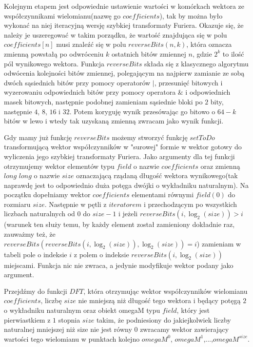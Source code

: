 \documentclass{article}
\begin{document}
Kolejnym etapem jest odpowiednie ustawienie wartości w komórkach wektora ze współczynnikami wielomianu(nazwę go $coefficients$), tak by można było wykonać na niej iteracyjną wersję szybkiej transformaty
Furiera. Okazuje się, że należy je uszeregować w takim porządku, że wartość znajdująca się w polu $coefficients[n]$ musi znaleźć
się w polu $reverseBits(n,k)$, która oznacza zmienną powstałą po odwróceniu $k$ ostatnich bitów zmiennej $n$, gdzie 
$2^k$ to ilość pól wynikowego wektora. Funkcja $reverseBits$ składa się z klasycznego algorytmu odwócenia kolejności bitów 
zmiennej, polegającym na najpierw zamianie ze sobą dwóch sąsiednich bitów przy pomocy operatorów $|$, przesunięć bitowych
i wyzerowaniu odpowiednich bitów przy pomocy operatora $\&$ i odpowiednich masek bitowych, następnie podobnej zamieniam sąsiednie bloki
po $2$ bity, następnie $4$, $8$, $16$ i $32$. Potem koryguję wynik przesówając go bitowo o $64-k$ bitów w lewo i wtedy tak uzyskaną zmienną zwracam jako wynik funkcji.

Gdy mamy już funkcję $reverseBits$ możemy stworzyć funkcję $setToDo$ transformującą wektor współczynników w "surowej" formie w wektor gotowy
do wyliczenia jego szybkiej transformaty Furiera. Jako argumenty dla tej funkcji otrzymujemy wektor elementów typu $field$ o nazwie $coefficients$ oraz
zmienną $long$ $long$ o nazwie $size$ oznaczającą rządaną długość wektora wynikowego(tak naprawdę jest to odpowiednio duża potęga dwójki o wykładniku naturalnym). Na początku dopełniamy wektor $coefficients$ elementami równymi $field(0)$ do rozmiaru $size$. Następnie w pętli z $iteratorem$ i przechodzącym po wszystkich liczbach naturalnych od $0$ do $size-1$ i jeżeli $reverseBits(i,\log_2(size)) > i$(warunek ten służy temu, by każdy element został zamieniony dokładnie raz, zauważmy też, że $reverseBits( reverseBits (i ,\log_2(size)),\log_2(size))=i$) zamieniam w tabeli pole o indeksie $i$ z polem o indeksie 
$reverseBits (i ,\log_2(size))$ miejscami. Funkcja nic nie zwraca, a jedynie modyfikuje wektor podany jako argument.

Przejdźmy do funkcji $DFT$, która otrzymując wektor współczynników wielomianu $coefficients$, liczbę $size$ nie mniejszą niż długość tego wektora i będący potęgą $2$ o wykładniku naturalnym oraz obiekt omegaM typu $field$, który jest pierwiastkiem z $1$ stopnia $size$ takim, że podniesiony do jakiejkolwiek liczby naturalnej mniejszej niż size nie jest równy $0$ zwracamy wektor zawierający wartości tego wielomianu w punktach kolejno $omegaM^0$, $omegaM^1$,...,$omegaM^{size}$. 
\end{document}
